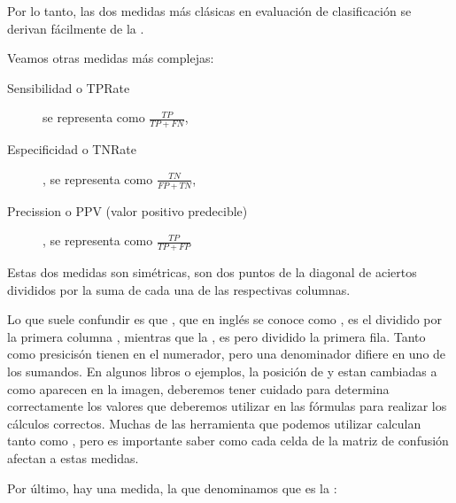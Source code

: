 Por lo tanto, las dos medidas más clásicas en evaluación de clasificación se derivan fácilmente de la .

Veamos otras medidas más complejas:
\begin{description}
    \item[Sensibilidad o TPRate] se representa como $\frac{TP}{TP+FN}$,
    \item[Especificidad o TNRate], se representa como  $\frac{TN}{FP+TN}$,
    \item[Precission o PPV (valor positivo predecible)] , se representa como  $\frac{TP}{TP+FP}$
\end{description}

Estas dos medidas son simétricas, son dos puntos de la diagonal de aciertos divididos por la suma de cada una de las respectivas columnas.

Lo que suele confundir es que , que en inglés se conoce como , es el  dividido por la primera columna , mientras que la , es  pero dividido la primera fila. Tanto  como presicisón tienen  en el numerador, pero una denominador difiere en uno de los sumandos. En algunos libros o ejemplos, la posición de  y  estan cambiadas a como aparecen en la imagen, deberemos tener cuidado para determina correctamente los valores que deberemos utilizar en las fórmulas para realizar los cálculos correctos. Muchas de las herramienta que podemos utilizar calculan tanto  como , pero es importante saber como  cada celda de la matriz de confusión afectan a estas medidas.

Por último, hay una medida, la que denominamos  que es la :

